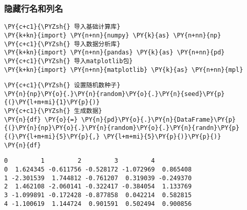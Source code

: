     \hypertarget{ux9690ux85cfux884cux540dux548cux5217ux540d}{%
\subsubsection{隐藏行名和列名}\label{ux9690ux85cfux884cux540dux548cux5217ux540d}}

    \begin{tcolorbox}[breakable, size=fbox, boxrule=1pt, pad at break*=1mm,colback=cellbackground, colframe=cellborder]
\begin{Verbatim}[commandchars=\\\{\}]
\PY{c+c1}{\PYZsh{} 导入基础计算库}
\PY{k+kn}{import} \PY{n+nn}{numpy} \PY{k}{as} \PY{n+nn}{np}
\PY{c+c1}{\PYZsh{} 导入数据分析库}
\PY{k+kn}{import} \PY{n+nn}{pandas} \PY{k}{as} \PY{n+nn}{pd}
\PY{c+c1}{\PYZsh{} 导入matplotlib包}
\PY{k+kn}{import} \PY{n+nn}{matplotlib} \PY{k}{as} \PY{n+nn}{mpl}
\end{Verbatim}
\end{tcolorbox}

    \begin{tcolorbox}[breakable, size=fbox, boxrule=1pt, pad at break*=1mm,colback=cellbackground, colframe=cellborder]
\begin{Verbatim}[commandchars=\\\{\}]
\PY{c+c1}{\PYZsh{} 设置随机数种子}
\PY{n}{np}\PY{o}{.}\PY{n}{random}\PY{o}{.}\PY{n}{seed}\PY{p}{(}\PY{l+m+mi}{1}\PY{p}{)}
\PY{c+c1}{\PYZsh{} 生成数据}
\PY{n}{df} \PY{o}{=} \PY{n}{pd}\PY{o}{.}\PY{n}{DataFrame}\PY{p}{(}\PY{n}{np}\PY{o}{.}\PY{n}{random}\PY{o}{.}\PY{n}{randn}\PY{p}{(}\PY{l+m+mi}{5}\PY{p}{,} \PY{l+m+mi}{5}\PY{p}{)}\PY{p}{)}
\PY{n}{df}
\end{Verbatim}
\end{tcolorbox}

            \begin{tcolorbox}[breakable, size=fbox, boxrule=.5pt, pad at break*=1mm, opacityfill=0]
\begin{Verbatim}[commandchars=\\\{\}]
          0         1         2         3         4
0  1.624345 -0.611756 -0.528172 -1.072969  0.865408
1 -2.301539  1.744812 -0.761207  0.319039 -0.249370
2  1.462108 -2.060141 -0.322417 -0.384054  1.133769
3 -1.099891 -0.172428 -0.877858  0.042214  0.582815
4 -1.100619  1.144724  0.901591  0.502494  0.900856
\end{Verbatim}
\end{tcolorbox}
        
